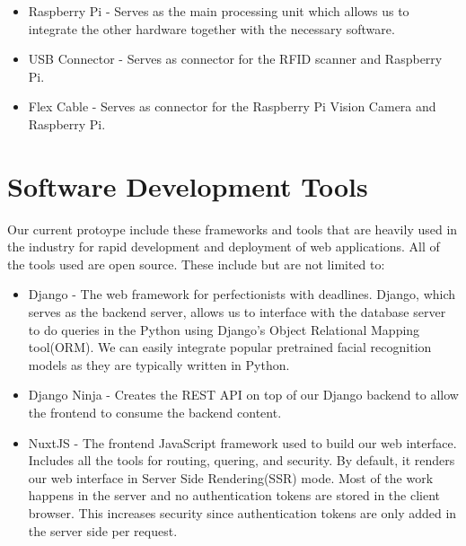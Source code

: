 \begin{itemize}
	\item	Raspberry Pi - Serves as the main processing unit which allows us to integrate the other hardware together with the necessary software.
	
\end{itemize}

\begin{itemize}
	\item	USB Connector -  Serves as connector for the RFID scanner and Raspberry Pi.
	
\end{itemize}

\begin{itemize}
	\item	Flex Cable -  Serves as connector for the Raspberry Pi Vision Camera and Raspberry Pi. 
	
\end{itemize}
	
\section{Software Development Tools}
\label{sec:devtools}
 Our current protoype include these frameworks and tools that are heavily used in the industry for rapid development and deployment of web applications. All of the tools used are open source. These include but are not limited to:
 
\begin{itemize}
	\item	Django - The web framework for perfectionists with deadlines. Django, which serves as the backend server, allows us to interface with the database server to do queries in the Python using Django's Object Relational Mapping tool(ORM). We can easily integrate popular pretrained facial recognition models as they are typically written in Python.
\end{itemize}

\begin{itemize}
	\item	Django Ninja - Creates the REST API on top of our Django backend to allow the frontend to consume the backend content.
\end{itemize}

\begin{itemize}
	\item	NuxtJS - The frontend JavaScript framework used to build our web interface. Includes all the tools for routing, quering, and security. By default, it renders our web interface in Server Side Rendering(SSR) mode. Most of the work happens in the server and no authentication tokens are stored in the client browser. This increases security since authentication tokens are only added in the server side per request.
\end{itemize}
	

